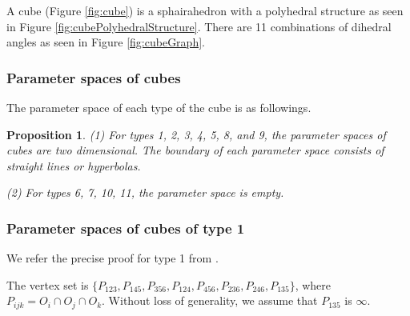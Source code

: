 \documentclass[suppldata, dvipdfmx]{interact}
\theoremstyle{plain}%
\newtheorem{lemma}[theorem]{Lemma}
\newtheorem{proposition}[theorem]{Proposition}
\theoremstyle{definition}
\theoremstyle{remark}
\theoremstyle{problemstyle}
\begin{document}



A cube (Figure \ref{fig:cube}) is a sphairahedron with a polyhedral structure as seen in Figure \ref{fig:cubePolyhedralStructure}.  There are 11 combinations of dihedral angles as seen in Figure \ref{fig:cubeGraph}.

\subsubsection{Parameter spaces of cubes} \label{section:cubeType1}

The parameter space of each type of the cube is as followings.

\begin{proposition}\label{prop:paraSpace_cube}
(1) For types 1, 2, 3, 4, 5, 8, and 9, the parameter spaces of cubes are two dimensional.  The boundary of each parameter space consists of straight lines or hyperbolas. \par  
(2) For types 6, 7, 10, 11, the parameter space is empty.
\end{proposition}

\subsubsection{Parameter spaces of cubes of type 1}

We refer the precise proof for type 1 from \cite{AharaAraki2}.

The vertex set is $\{ P_{123}, P_{145}, P_{356}, P_{124}, P_{456}, P_{236}, P_{246}, P_{135} \}$, where $P_{ijk} = O_i \cap O_j \cap O_k$.  Without loss of generality, we assume that $P_{135}$ is $\infty$. 
\end{document}
